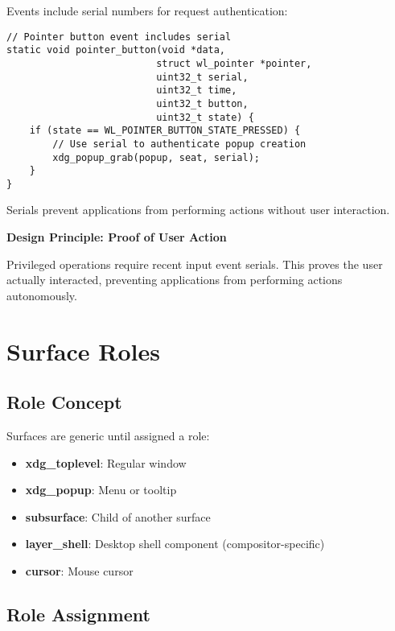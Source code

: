 Events include serial numbers for request authentication:

\begin{lstlisting}[style=cstyle, caption=Serial-Based Authentication]
// Pointer button event includes serial
static void pointer_button(void *data,
                          struct wl_pointer *pointer,
                          uint32_t serial,
                          uint32_t time,
                          uint32_t button,
                          uint32_t state) {
    if (state == WL_POINTER_BUTTON_STATE_PRESSED) {
        // Use serial to authenticate popup creation
        xdg_popup_grab(popup, seat, serial);
    }
}
\end{lstlisting}

Serials prevent applications from performing actions without user interaction.

\begin{designbox}
\textbf{Design Principle: Proof of User Action}

Privileged operations require recent input event serials. This proves the user actually interacted, preventing applications from performing actions autonomously.
\end{designbox}

\section{Surface Roles}

\subsection{Role Concept}

Surfaces are generic until assigned a role:

\begin{itemize}
    \item \textbf{xdg\_toplevel}: Regular window
    \item \textbf{xdg\_popup}: Menu or tooltip
    \item \textbf{subsurface}: Child of another surface
    \item \textbf{layer\_shell}: Desktop shell component (compositor-specific)
    \item \textbf{cursor}: Mouse cursor
\end{itemize}

\subsection{Role Assignment}

